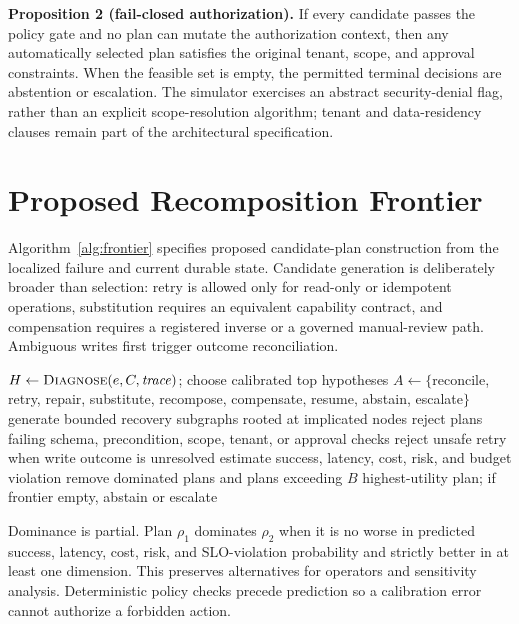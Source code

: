 \documentclass[10pt,journal,compsoc]{IEEEtran}
\begin{document}
\textbf{Proposition 2 (fail-closed authorization).} If every candidate passes the policy gate and no plan can mutate the authorization context, then any automatically selected plan satisfies the original tenant, scope, and approval constraints. When the feasible set is empty, the permitted terminal decisions are abstention or escalation. The simulator exercises an abstract security-denial flag, rather than an explicit scope-resolution algorithm; tenant and data-residency clauses remain part of the architectural specification.

\section{Proposed Recomposition Frontier}\label{sec:frontier}
Algorithm~\ref{alg:frontier} specifies proposed candidate-plan construction from the localized failure and current durable state. Candidate generation is deliberately broader than selection: retry is allowed only for read-only or idempotent operations, substitution requires an equivalent capability contract, and compensation requires a registered inverse or a governed manual-review path. Ambiguous writes first trigger outcome reconciliation.

\begin{algorithm}[t]
\caption{RecompositionFrontier$(s,e,B)$}\label{alg:frontier}
\small
\begin{algorithmic}[1]
\State $H\gets \textsc{Diagnose}(e,C,\mathit{trace})$; choose calibrated top hypotheses
\State $A\gets\{$reconcile, retry, repair, substitute, recompose, compensate, resume, abstain, escalate$\}$
\State generate bounded recovery subgraphs rooted at implicated nodes
\State reject plans failing schema, precondition, scope, tenant, or approval checks
\State reject unsafe retry when write outcome is unresolved
\State estimate success, latency, cost, risk, and budget violation
\State remove dominated plans and plans exceeding $B$
\State \Return highest-utility plan; if frontier empty, abstain or escalate
\end{algorithmic}
\end{algorithm}

Dominance is partial. Plan $\rho_1$ dominates $\rho_2$ when it is no worse in predicted success, latency, cost, risk, and SLO-violation probability and strictly better in at least one dimension. This preserves alternatives for operators and sensitivity analysis. Deterministic policy checks precede prediction so a calibration error cannot authorize a forbidden action.
\end{document}
